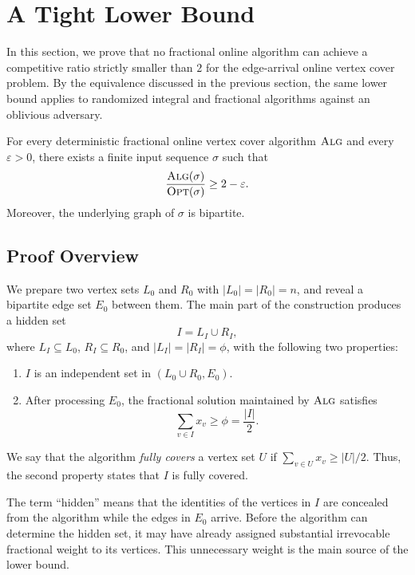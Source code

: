 \section{A Tight Lower Bound}
\label{sec:lower-bound}

In this section, we prove that no fractional online algorithm can achieve a competitive ratio strictly smaller than $2$ for the edge-arrival online vertex cover problem. By the equivalence discussed in the previous section, the same lower bound applies to randomized integral and fractional algorithms against an oblivious adversary.

\begin{theorem}
\label{thm:main}
For every deterministic fractional online vertex cover algorithm $\textsc{Alg}$ and every $\varepsilon>0$, there exists a finite input sequence $\sigma$ such that
$$
\frac{\textsc{Alg}(\sigma)}{\textsc{Opt}(\sigma)}
\geq 2-\varepsilon.
$$
Moreover, the underlying graph of $\sigma$ is bipartite.
\end{theorem}

\subsection{Proof Overview}

We prepare two vertex sets $L_0$ and $R_0$ with $|L_0|=|R_0|=n$, and reveal a bipartite edge set $E_0$ between them. The main part of the construction produces a hidden set
$$
I=L_I\cup R_I,
$$
where $L_I\subseteq L_0$, $R_I\subseteq R_0$, and $|L_I|=|R_I|=\phi$, with the following two properties:
\begin{enumerate}
    \item $I$ is an independent set in $(L_0\cup R_0,E_0)$.
    \item After processing $E_0$, the fractional solution maintained by $\textsc{Alg}$ satisfies
    $$
    \sum_{v\in I}x_v\geq \phi=\frac{|I|}{2}.
    $$
\end{enumerate}

We say that the algorithm \emph{fully covers} a vertex set $U$ if $\sum_{v\in U}x_v\geq |U|/2$. Thus, the second property states that $I$ is fully covered.

The term ``hidden'' means that the identities of the vertices in $I$ are concealed from the algorithm while the edges in $E_0$ arrive. Before the algorithm can determine the hidden set, it may have already assigned substantial irrevocable fractional weight to its vertices. This unnecessary weight is the main source of the lower bound.

